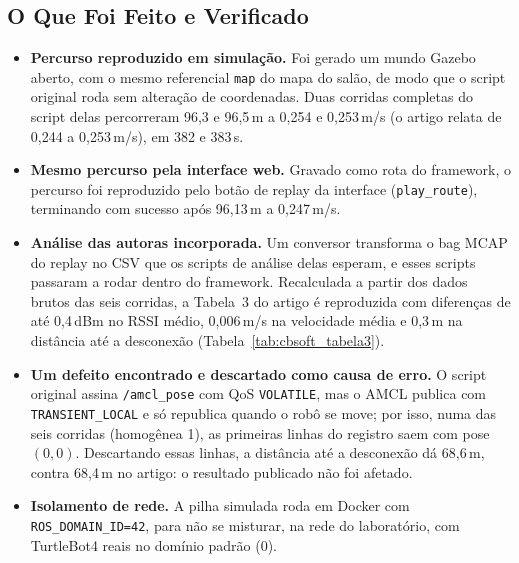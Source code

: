 \subsection{O Que Foi Feito e Verificado}

\begin{itemize}
    \item \textbf{Percurso reproduzido em simulação.} Foi gerado um mundo
    Gazebo aberto, com o mesmo referencial \texttt{map} do mapa do salão,
    de modo que o script original roda sem alteração de coordenadas. Duas
    corridas completas do script delas percorreram 96,3 e 96,5\,m a 0,254 e
    0,253\,m/s (o artigo relata de 0,244 a 0,253\,m/s), em 382 e 383\,s.
    \item \textbf{Mesmo percurso pela interface web.} Gravado como rota do
    framework, o percurso foi reproduzido pelo botão de replay da interface
    (\texttt{play\_\allowbreak route}), terminando com sucesso após 96,13\,m a
    0,247\,m/s.
    \item \textbf{Análise das autoras incorporada.} Um conversor transforma
    o bag MCAP do replay no CSV que os scripts de análise delas esperam, e
    esses scripts passaram a rodar dentro do framework. Recalculada a partir
    dos dados brutos das seis corridas, a Tabela~3 do artigo é reproduzida
    com diferenças de até 0,4\,dBm no RSSI médio, 0,006\,m/s na velocidade
    média e 0,3\,m na distância até a desconexão
    (Tabela~\ref{tab:cbsoft_tabela3}).
    \item \textbf{Um defeito encontrado e descartado como causa de erro.} O
    script original assina \texttt{/\allowbreak amcl\_\allowbreak pose} com QoS
    \texttt{VOLATILE}, mas o AMCL publica com \texttt{TRANSIENT\_\allowbreak LOCAL}
    e só republica quando o robô se move; por isso, numa das seis corridas
    (homogênea 1), as primeiras linhas do registro saem com pose $(0,0)$.
    Descartando essas linhas, a distância até a desconexão dá 68,6\,m, contra
    68,4\,m no artigo: o resultado publicado não foi afetado.
    \item \textbf{Isolamento de rede.} A pilha simulada roda em Docker com
    \texttt{ROS\_\allowbreak DOMAIN\_\allowbreak ID=42}, para não se misturar, na rede do
    laboratório, com TurtleBot4 reais no domínio padrão (0).
\end{itemize}

